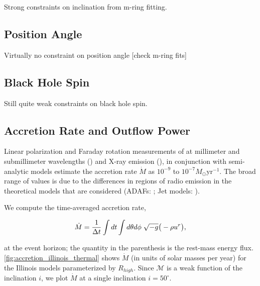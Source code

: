 
Strong constraints on inclination from m-ring fitting.

\subsection{Position Angle}

Virtually no constraint on position angle [check m-ring fits]

\subsection{Black Hole Spin}

Still quite weak constraints on black hole spin.

\subsection{Accretion Rate and Outflow Power}


Linear polarization and Faraday rotation measurements of \sgra at millimeter and submillimeter wavelengths (\citealt{2000ApJ...538L.121A, 2000ApJ...545..842Q, Bower_2003, Marrone_2006, 2006JPhCS..54..354M, 2006ApJ...646L.111M}) and X-ray emission  (\citealt{2003ApJ...591..891B, doi:10.1126/science.1240755}), in conjunction with semi-analytic models estimate the accretion rate $\dot{M}$ as $10^{-9}$ to $10^{-7} M_{\odot}$yr$^{-1}$. The broad range of values is due to the differences in regions of radio emission in the theoretical models that are considered (ADAFs: \citealt{1998ApJ...492..554N, Yuan_2003}; Jet models: \citealt{1993A&A...278L...1F, 2000A&A...362..113F}).

We compute the time-averaged accretion rate,

\begin{equation}
    \dot{M} = \frac{1}{\Delta t}\int dt\int d\theta d\phi\hspace{0.1cm}\sqrt{-g}\big(-\rho u^{r}\big),
\end{equation}

at the event horizon; the quantity in the parenthesis is the rest-mass energy flux. \ref{fig:accretion_illinois_thermal} shows $\dot{M}$ (in units of solar masses per year) for the Illinois models parameterized by $R_{high}$. Since $\mathcal{M}$ is a weak function of the inclination $i$, we plot $\dot{M}$ at a single inclination $i=50^{\circ}$.

